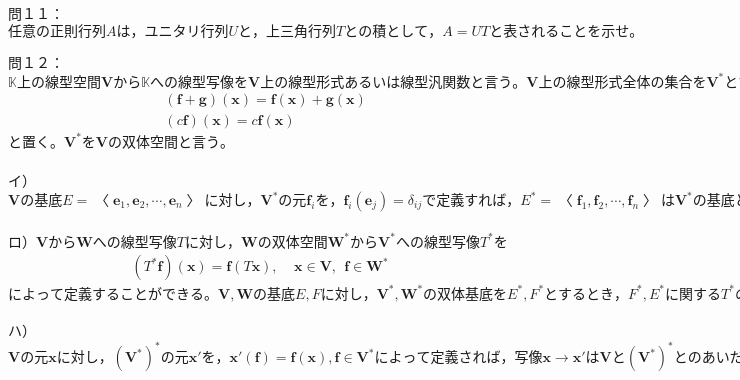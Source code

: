\documentclass[dvipdfmx,uplatex,11pt]{jsarticle}
\begin{document}
%
%
%
\newpage
%
%
%
\noindent
問１１：$任意の正則行列Aは，ユニタリ行列Uと，上三角行列Tとの積として，A=UTと表されることを示せ。$
























%
%
%
\newpage
%
%
%
\noindent
問１２：$\mathbb{K}上の線型空間\bm{V}から\mathbb{K}への線型写像を\bm{V}上の\textbf{線型形式}あるいは\textbf{線型汎関数}と言う。\bm{V}上の線型形式全体の集合を\bm{V}^{*}とすれば，\bm{V}^{*}は\mathbb{K}上の線型空間である。ただし，\bm{f},\bm{g} \in \bm{V}^{*}に対し$
\begin{eqnarray*}
& (\bm{f}+\bm{g})(\bm{x})=\bm{f}(\bm{x})+\bm{g}(\bm{x}) \\
& (c\bm{f})(\bm{x})=c\bm{f}(\bm{x})
\end{eqnarray*}
と置く。$\bm{V}^{*}を\bm{V}の\textbf{双体空間}と言う。$\\
\\
イ）$\bm{V}の基底E=〈\bm{e}_1 ,\bm{e}_2 ,\cdots ,\bm{e}_n〉に対し，\bm{V}^{*}の元\bm{f}_iを，\bm{f}_i(\bm{e}_j)=\delta_{ij}で定義すれば，E^{*}=〈\bm{f}_1 ,\bm{f}_2 ,\cdots ,\bm{f}_n〉は\bm{V}^{*}の基底となることを示せ。（このE^{*}をEの\textbf{双体基底}という）$\\
\\
ロ）$\bm{V}から\bm{W}への線型写像Tに対し，\bm{W}の双体空間\bm{W}^{*}から\bm{V}^{*}への線型写像T^{*}を$
\begin{eqnarray*}
(T^{*}\bm{f})(\bm{x})=\bm{f}(T\bm{x}),~~~~~\bm{x} \in \bm{V},~~\bm{f} \in \bm{W^{*}}
\end{eqnarray*}
$によって定義することができる。\bm{V},\bm{W}の基底E,Fに対し，\bm{V}^{*},\bm{W}^{*}の双体基底をE^{*},F^{*}とするとき，F^{*},E^{*}に関するT^{*}の行列は，E,Fに関するTの行列の転置行列であることを示せ。$\\
\\
ハ）$\bm{V}の元\bm{x}に対し，(\bm{V}^{*})^{*}の元\bm{x}'を，\bm{x}'(\bm{f})=\bm{f}(\bm{x}),\bm{f} \in \bm{V}^{*}によって定義されば，写像\bm{x} \rightarrow \bm{x}'は\bm{V}と(\bm{V}^{*})^{*}とのあいだの同型対応を与えることを示せ。$
\end{document}

